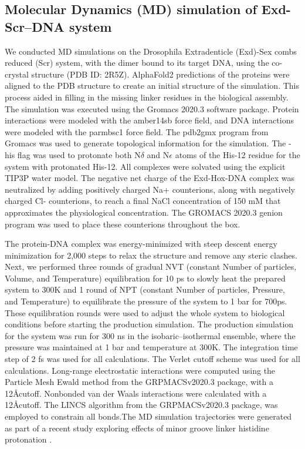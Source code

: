 \subsection{Molecular Dynamics (MD) simulation of Exd-Scr–DNA system}
We conducted MD simulations on the Drosophila Extradenticle (Exd)-Sex combs reduced (Scr) system, with the dimer bound to its target DNA, using the co-crystal structure (PDB ID: 2R5Z). AlphaFold2 predictions of the proteins were aligned to the PDB structure to create an initial structure of the simulation. This process aided in filling in the missing linker residues in the biological assembly. The simulation was executed using the Gromacs \citep{Abraham2015} 2020.3 software package. Protein interactions were modeled with the amber14sb \citep{Maier2015} force field, and DNA interactions were modeled with the parmbsc1 \citep{Ivani2016} force field. The pdb2gmx program from Gromacs was used to generate topological information for the simulation. The -his flag was used to protonate both N$\delta$ and N$\epsilon$ atoms of the His-12 residue for the system with protonated His-12. All complexes were solvated using the explicit TIP3P water model. The negative net charge of the Exd-Hox-DNA complex was neutralized by adding positively charged Na+ counterions, along with negatively charged Cl- counterions, to reach a final NaCl concentration of 150 mM that approximates the physiological concentration. The GROMACS 2020.3 genion program was used to place these counterions throughout the box. 
\par
The protein-DNA complex was energy-minimized with steep descent energy minimization for 2,000 steps to relax the structure and remove any steric clashes. Next, we performed three rounds of gradual NVT (constant Number of particles, Volume, and Temperature) equilibration for 10 ps to slowly heat the prepared system to 300K and 1 round of NPT (constant Number of particles, Pressure, and Temperature) to equilibrate the pressure of the system to 1 bar for 700ps. These equilibration rounds were used to adjust the whole system to biological conditions before starting the production simulation. The production simulation for the system was run for 300 ns in the isobaric–isothermal ensemble, where the pressure was maintained at 1 bar and temperature at 300K. The integration time step of 2 fs was used for all calculations. The Verlet cutoff scheme was used for all calculations. Long-range electrostatic interactions were computed using the Particle Mesh Ewald method \citep{Darden1993} from the GRPMACSv2020.3 package, with a 12\AA cutoff. Nonbonded van der Waals interactions were calculated with a 12\AA cutoff. The LINCS \citep{Hess1997} algorithm from the GRPMACSv2020.3 package, was employed to constrain all bonds.The MD simulation trajectories were generated as part of a recent study exploring effects of minor groove linker histidine protonation \citep{Jiang2023}.
\\

